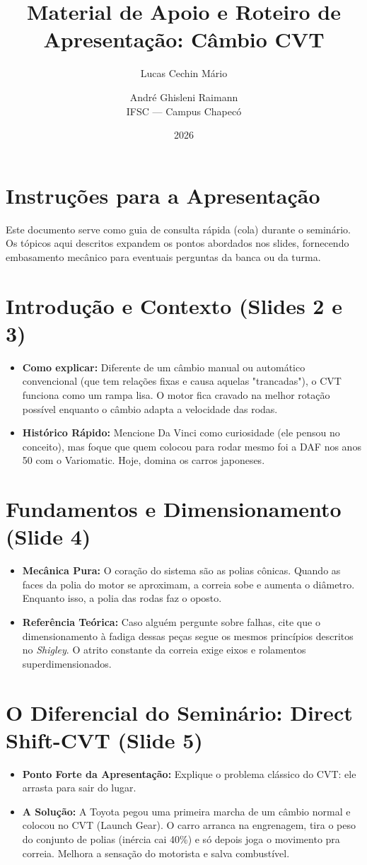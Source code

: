 \documentclass[12pt,a4paper]{article}
\title{\textbf{Material de Apoio e Roteiro de Apresentação: Câmbio CVT}}
\author{Lucas Cechin Mário \and André Ghisleni Raimann \\ IFSC — Campus Chapecó}
\date{2026}
\begin{document}
\maketitle

\section*{Instruções para a Apresentação}
Este documento serve como guia de consulta rápida (cola) durante o seminário. Os tópicos aqui descritos expandem os pontos abordados nos slides, fornecendo embasamento mecânico para eventuais perguntas da banca ou da turma.

\section{Introdução e Contexto (Slides 2 e 3)}
\begin{itemize}
    \item \textbf{Como explicar:} Diferente de um câmbio manual ou automático convencional (que tem relações fixas e causa aquelas "trancadas"), o CVT funciona como um rampa lisa. O motor fica cravado na melhor rotação possível enquanto o câmbio adapta a velocidade das rodas.
    \item \textbf{Histórico Rápido:} Mencione Da Vinci como curiosidade (ele pensou no conceito), mas foque que quem colocou para rodar mesmo foi a DAF nos anos 50 com o Variomatic. Hoje, domina os carros japoneses.
\end{itemize}

\section{Fundamentos e Dimensionamento (Slide 4)}
\begin{itemize}
    \item \textbf{Mecânica Pura:} O coração do sistema são as polias cônicas. Quando as faces da polia do motor se aproximam, a correia sobe e aumenta o diâmetro. Enquanto isso, a polia das rodas faz o oposto.
    \item \textbf{Referência Teórica:} Caso alguém pergunte sobre falhas, cite que o dimensionamento à fadiga dessas peças segue os mesmos princípios descritos no \textit{Shigley}. O atrito constante da correia exige eixos e rolamentos superdimensionados.
\end{itemize}

\section{O Diferencial do Seminário: Direct Shift-CVT (Slide 5)}
\begin{itemize}
    \item \textbf{Ponto Forte da Apresentação:} Explique o problema clássico do CVT: ele arrasta para sair do lugar. 
    \item \textbf{A Solução:} A Toyota pegou uma primeira marcha de um câmbio normal e colocou no CVT (Launch Gear). O carro arranca na engrenagem, tira o peso do conjunto de polias (inércia cai 40\%) e só depois joga o movimento pra correia. Melhora a sensação do motorista e salva combustível.
\end{itemize}
\end{document}
